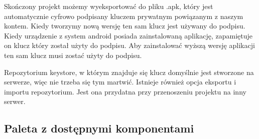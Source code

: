 Skończony projekt możemy wyeksportować do pliku .apk, który jest automatycznie cyfrowo podpisany kluczem prywatnym powiązanym z naszym kontem. Kiedy tworzymy nową wersję ten sam klucz jest używany do podpisu. Kiedy urządzenie z system android posiada zainstalowaną aplikację, zapamiętuje on klucz który został użyty do podpisu. Aby zainstalować wyższą wersję aplikacji ten sam klucz musi zostać użyty do podpisu.

Repozytorium keystore, w którym znajduje się klucz domyślnie jest stworzone na serwerze, więc nie trzeba się tym martwić. Istnieje również opcja eksportu i importu repozytorium. Jest ona przydatna przy przenoszeniu projektu na inny serwer.

\subsection{Paleta z dostępnymi komponentami}

